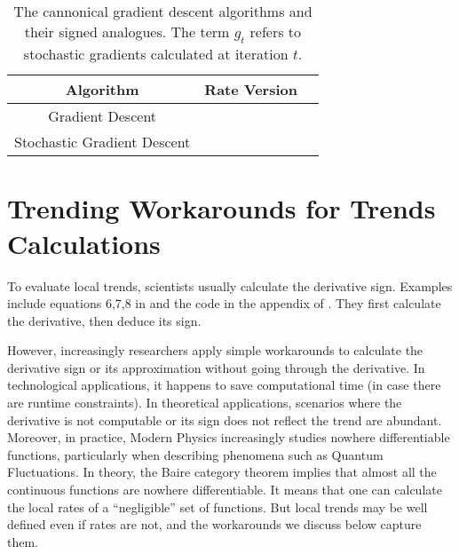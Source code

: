 \documentclass[11pt]{book}
\begin{document}
\begin{table}[H]
\centering
        \begin{tabular}{ccc}
        \toprule
        \textbf{Algorithm} & \color[HTML]{FFA006} {\textbf{Rate Version}} & \color[HTML]{0039BD}{\textbf{Trend Version}} \\
        \midrule
        Gradient Descent & \color[HTML]{FFA006}{$x_{t+1}=x_{t}-\alpha_{t}\nabla f_{t}$} & \color[HTML]{0039BD}{$x_{t+1}=x_{t}-\alpha_{t}\text{sgn}\left(\nabla f_{t}\right)$} \\
        Stochastic Gradient Descent & \color[HTML]{FFA006}{$x_{t+1}=x_{t}-\alpha_{t}g_{t}$} & \color[HTML]{0039BD}{$x_{t+1}=x_{t}-\alpha_{t}\text{sgn}\left(g_{t}\right)$} \\
        \bottomrule
        \end{tabular}
\caption{The cannonical gradient descent algorithms and their signed analogues. The term $g_t$ refers to stochastic gradients calculated at iteration $t$.}
\end{table}

\chapter{Trending Workarounds for Trends Calculations}

To evaluate local trends, scientists usually calculate the derivative
sign. Examples include equations 6,7,8 in \cite{meddah2019fpga}
and the code in the appendix of \cite{alfarra2021combating}.
They first calculate the derivative, then deduce its sign.

However, increasingly researchers apply simple workarounds to calculate
the derivative sign or its approximation without going through the
derivative. In technological applications, it happens to save computational
time (in case there are runtime constraints). In theoretical applications,
scenarios where the derivative is not computable or its sign does not
reflect the trend are abundant. Moreover, in practice, Modern Physics
increasingly studies nowhere differentiable functions, particularly
when describing phenomena such as Quantum Fluctuations. In theory,
the Baire category theorem implies that almost all the continuous
functions are nowhere differentiable. It means that one can calculate
the local rates of a ``negligible'' set of functions. But local
trends may be well defined even if rates are not, and the workarounds
we discuss below capture them.

\end{document}
